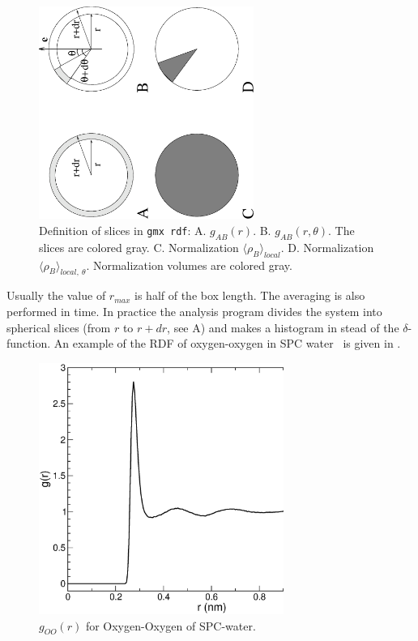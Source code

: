 \begin{figure}
\centerline{
{\includegraphics[width=7cm,angle=270]{plots/rdf}}}
\caption[Definition of slices in {\tt gmx rdf}.]{Definition of slices
in {\tt gmx rdf}: A. $g_{AB}(r)$. B. $g_{AB}(r,\theta)$. The slices are
colored gray. C. Normalization $\langle\rho_B\rangle_{local}$. D. Normalization
$\langle\rho_B\rangle_{local,\:\theta }$. Normalization volumes are colored gray.}
\label{fig:rdfex}
\end{figure}

Usually the value of $r_{max}$ is half of the box length.  The
averaging is also performed in time.  In practice the analysis program
{\tt {}} divides the system into spherical slices (from $r$ to
$r+dr$, see A) and makes a histogram in stead of
the $\delta$-function. An example of the RDF of oxygen-oxygen in
SPC water~\cite{Berendsen81} is given in .

\begin{figure}
\centerline{
{\includegraphics[width=8cm]{plots/rdfO-O}}}
\caption{$g_{OO}(r)$ for Oxygen-Oxygen of SPC-water.}
\label{fig:rdf}
\end{figure}

